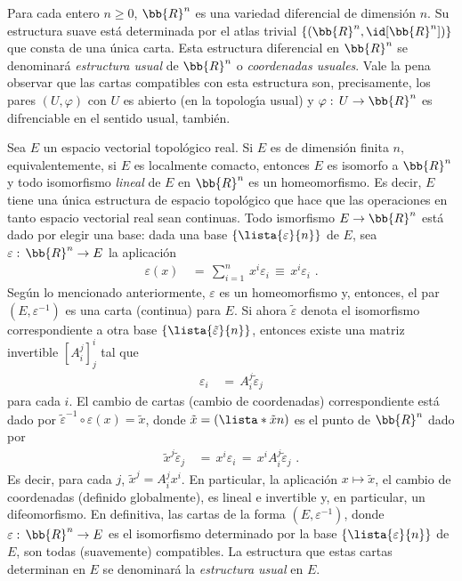 \begin{ejemplo}%
Para cada entero $n\geq 0$, $\bb{R}^{n}$ es una variedad diferencial de
dimensi\'{o}n $n$. Su estructura suave est\'{a} determinada por el atlas
trivial $\{(\bb{R}^{n},\id[\bb{R}^{n}])\}$ que consta de una \'{u}nica carta.
Esta estructura diferencial en $\bb{R}^{n}$ se denominar\'{a}
\emph{estructura usual} de $\bb{R}^{n}$ o \emph{coordenadas usuales}.
Vale la pena observar que las cartas compatibles con esta estructura
son, precisamente, los pares $(U,\varphi)$ con $U$ es abierto (en la
topolog\'{\i}a usual) y $\varphi:\,U\rightarrow\bb{R}^{n}$ es difrenciable
en el sentido usual, tambi\'{e}n.
\end{ejemplo}

\begin{ejemplo}%
Sea $E$ un espacio vectorial topol\'{o}gico real. Si $E$ es de dimensi\'{o}n
finita $n$, equivalentemente, si $E$ es localmente comacto, entonces $E$ es
isomorfo a $\bb{R}^{n}$ y todo isomorfismo \emph{lineal} de $E$ en
$\bb{R}^{n}$ es un homeomorfismo. Es decir, $E$ tiene una \'{u}nica estructura
de espacio topol\'{o}gico que hace que las operaciones en tanto espacio
vectorial real sean continuas. Todo ismorfismo $E\rightarrow\bb{R}^{n}$
est\'{a} dado por elegir una base: dada una base
$\{\lista{\varepsilon}{n}\}$ de $E$, sea $\varepsilon:\,\bb{R}^{n}\rightarrow E$
la aplicaci\'{o}n
\begin{align*}
	\varepsilon(x) & \,=\,\sum_{i=1}^{n}\,x^{i}\varepsilon_{i}
			\,\equiv\,x^{i}\varepsilon_{i}
	\text{ .}
\end{align*}
%
Seg\'{u}n lo mencionado anteriormente, $\varepsilon$ es un homeomorfismo
y, entonces, el par $(E,\varepsilon^{-1})$ es una carta (continua) para $E$.
Si ahora $\tilde{\varepsilon}$ denota el isomorfismo correspondiente a
otra base $\{\lista{\tilde{\varepsilon}}{n}\}$, entonces existe una matriz
invertible $\left[A_{i}^{j}\right]^{i}_{j}$ tal que
\begin{align*}
	\varepsilon_{i} & \,=\,A_{i}^{j}\tilde{\varepsilon}_{j}
\end{align*}
%
para cada $i$. El cambio de cartas (cambio de coordenadas) correspondiente
est\'{a} dado por $\tilde{\varepsilon}^{-1}\circ\varepsilon(x)=\tilde{x}$,
donde $\tilde{x}=(\lista*{\tilde{x}}{n})$ es el punto de $\bb{R}^{n}$ dado por
\begin{align*}
	\tilde{x}^{j}\tilde{\varepsilon}_{j} & \,=\,x^{i}\varepsilon_{i}
		\,=\,x^{i}A_{i}^{j}\tilde{\varepsilon}_{j}
	\text{ .}
\end{align*}
%
Es decir, para cada $j$, $\tilde{x}^{j}=A_{i}^{j}x^{i}$. En particular,
la aplicaci\'{o}n $x\mapsto\tilde{x}$, el cambio de coordenadas
(definido globalmente), es lineal e invertible y, en particular, un
difeomorfismo. En definitiva, las cartas de la forma $(E,\varepsilon^{-1})$,
donde $\varepsilon:\,\bb{R}^{n}\rightarrow E$ es el isomorfismo determinado
por la base $\{\lista{\varepsilon}{n}\}$ de $E$, son todas (suavemente)
compatibles. La estructura que estas cartas determinan en $E$ se
denominar\'{a} la \emph{estructura usual} en $E$.
\end{ejemplo}

